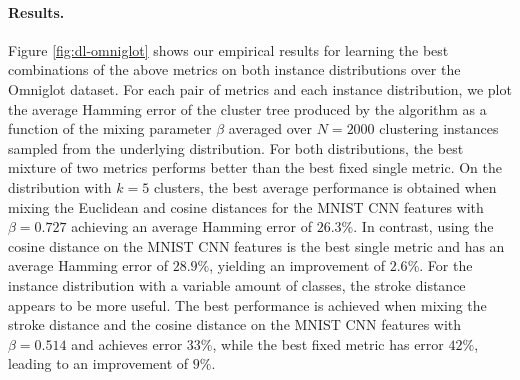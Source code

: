 \paragraph{Results.} Figure \ref{fig:dl-omniglot} shows our empirical results for learning the best combinations of the above metrics on both instance
distributions over the Omniglot dataset. For each pair of metrics and each
instance distribution, we plot the average Hamming error of the cluster tree
produced by the algorithm as a function of the mixing parameter $\beta$ averaged
over $N = 2000$ clustering instances sampled from the underlying distribution.
For both distributions, the best mixture of two metrics performs better than the
best fixed single metric. On the distribution with $k=5$ clusters, the best average
performance is obtained when mixing the Euclidean and cosine distances for the
MNIST CNN features with $\beta = 0.727$ achieving an average Hamming error of
$26.3\%$. In contrast, using the cosine distance on the MNIST CNN features is the
best single metric and has an average Hamming error of $28.9\%$, yielding an
improvement of $2.6\%$. For the instance distribution with a variable amount of classes, the stroke distance
appears to be more useful. The best performance is achieved when mixing the
stroke distance and the cosine distance on the MNIST CNN features with $\beta =
0.514$ and achieves error $33\%$, while the best fixed metric has error $42\%$,
leading to an improvement of $9\%$.


